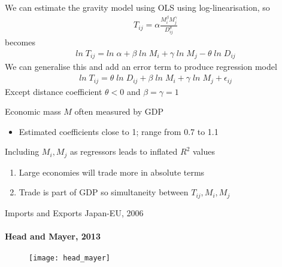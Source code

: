 \documentclass{beamer}
\begin{document}
\begin{frame}
  We can estimate the gravity model using OLS using log-linearisation, so    
    \begin{align*}
    T_{ij}=\alpha \frac{M_i^{\beta} M_j^{\gamma}}{D_{ij}^{\theta}}
  \end{align*}
  becomes
  \begin{align*}
    ln \; T_{ij}= ln\; \alpha + \beta \; ln \; M_i + \gamma \; ln \; M_j - \theta \; ln \; D_{ij}
  \end{align*}
  We can generalise this and add an error term to produce regression model
  \begin{align*}
    ln\; T_{ij} = \theta \; ln\; D_{ij} + \beta \; ln\; M_i + \gamma\; ln\; M_j + \epsilon_{ij}
  \end{align*} 
  \medskip
  Except distance coefficient $\theta<0$ and $\beta=\gamma=1$  
\end{frame}

\begin{frame}
  Economic mass $M$ often measured by GDP
  \begin{itemize}
    \item Estimated coefficients close to 1; range from 0.7 to 1.1
  \end{itemize}
  \medskip
  Including $M_i,M_j$ as regressors leads to inflated $R^2$ values
    \begin{enumerate}
      \item Large economies will trade more in absolute terms
      \item Trade is part of GDP so simultaneity between $T_{ij},M_i,M_j$
    \end{enumerate}  
\end{frame}

\begin{frame}{Imports and Exports Japan-EU, 2006}
\framesubtitle{Head and Mayer, 2013}
  \begin{figure}\centering
    \texttt{[image: head\_mayer]}
  \end{figure}  
\end{frame}
\end{document}
